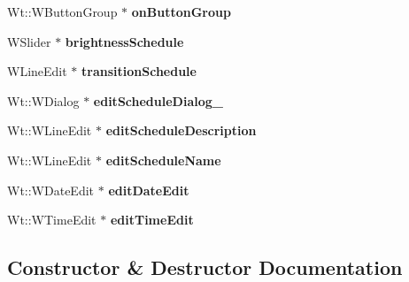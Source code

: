 \begin{DoxyCompactItemize}
\item 
Wt\+::\+W\+Button\+Group $\ast$ {\bfseries on\+Button\+Group}\hypertarget{classLightManagementWidget_aaee5db1e504e174c479e5cdc0c05f1d8}{}\label{classLightManagementWidget_aaee5db1e504e174c479e5cdc0c05f1d8}

\item 
W\+Slider $\ast$ {\bfseries brightness\+Schedule}\hypertarget{classLightManagementWidget_a43d80104e5a6ebc95306b4f7cc3d0cff}{}\label{classLightManagementWidget_a43d80104e5a6ebc95306b4f7cc3d0cff}

\item 
W\+Line\+Edit $\ast$ {\bfseries transition\+Schedule}\hypertarget{classLightManagementWidget_a866c4bd22470913d82b03a344f9ec85a}{}\label{classLightManagementWidget_a866c4bd22470913d82b03a344f9ec85a}

\item 
Wt\+::\+W\+Dialog $\ast$ {\bfseries edit\+Schedule\+Dialog\+\_\+}\hypertarget{classLightManagementWidget_a7fbc9ed222c8f28e682096bdfa93ceee}{}\label{classLightManagementWidget_a7fbc9ed222c8f28e682096bdfa93ceee}

\item 
Wt\+::\+W\+Line\+Edit $\ast$ {\bfseries edit\+Schedule\+Description}\hypertarget{classLightManagementWidget_a2c5a53051c346b1d611f7ac267789968}{}\label{classLightManagementWidget_a2c5a53051c346b1d611f7ac267789968}

\item 
Wt\+::\+W\+Line\+Edit $\ast$ {\bfseries edit\+Schedule\+Name}\hypertarget{classLightManagementWidget_ab9575daea224ed3c340387d447606360}{}\label{classLightManagementWidget_ab9575daea224ed3c340387d447606360}

\item 
Wt\+::\+W\+Date\+Edit $\ast$ {\bfseries edit\+Date\+Edit}\hypertarget{classLightManagementWidget_a299b7f356c693f7ea7dcbd6f417c0158}{}\label{classLightManagementWidget_a299b7f356c693f7ea7dcbd6f417c0158}

\item 
Wt\+::\+W\+Time\+Edit $\ast$ {\bfseries edit\+Time\+Edit}\hypertarget{classLightManagementWidget_a24a9a2f46f3984db535686c5a5b54035}{}\label{classLightManagementWidget_a24a9a2f46f3984db535686c5a5b54035}

\end{DoxyCompactItemize}


\subsection{Constructor \& Destructor Documentation}
